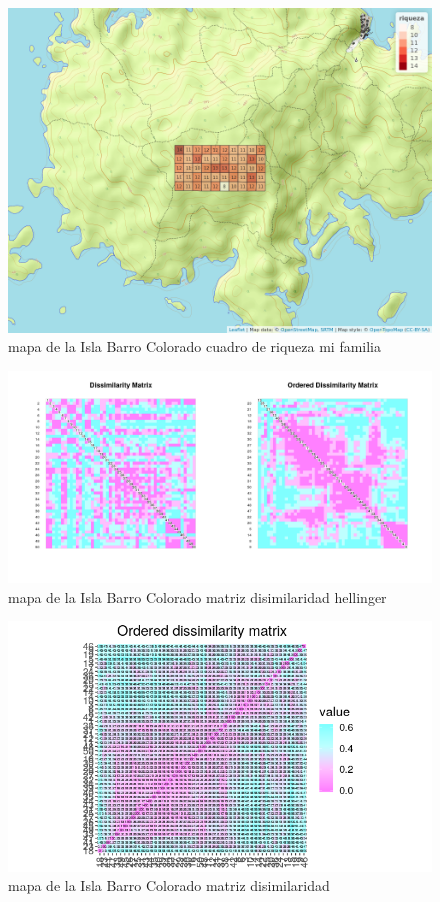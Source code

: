 \documentclass[11pt,]{article}
\begin{document}
\begin{figure}
\centering
\includegraphics[width=1.00000\textwidth]{mapa_cuadros_riq_mi_familia.png}
\caption{mapa de la Isla Barro Colorado cuadro de riqueza mi familia
\label{fig:bci_map}}
\end{figure}

\begin{figure}
\centering
\includegraphics[width=1.00000\textwidth]{matriz_disimilaridad_hellinger.png}
\caption{mapa de la Isla Barro Colorado matriz disimilaridad hellinger
\label{fig:bci_map}}
\end{figure}

\begin{figure}
\centering
\includegraphics[width=1.00000\textwidth]{matrizdedisimilaridad.png}
\caption{mapa de la Isla Barro Colorado matriz disimilaridad
\label{fig:bci_map}}
\end{figure}
\end{document}
